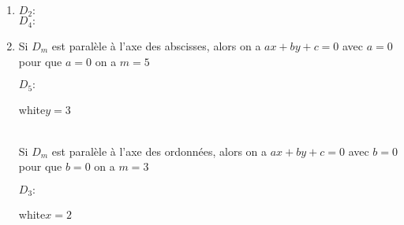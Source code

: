 \begin{enumerate}
\item $D_2 :$\\
$D_4 :$\\
             
\item Si $D_m$ est paralèle à l'axe des abscisses, alors on a $ax+by +c =0$ avec $a=0$\\

pour que $a = 0$ on a $m = 5$ \\

\begin{minipage}{9.5cm}
$D_5 :$
\begin{center}
  {white}{$y=3$}
\end{center}
\end{minipage}\\

         
Si $D_m$ est paralèle à l'axe des ordonnées, alors on a $ax+by +c =0$ avec $b=0$\\

pour que $b = 0$ on a $m = 3$ \\

\begin{minipage}{9.5cm}
$D_3 :$           
\begin{center}
  {white}{$x=2$}
\end{center}
\end{minipage}\\


\end{enumerate}
